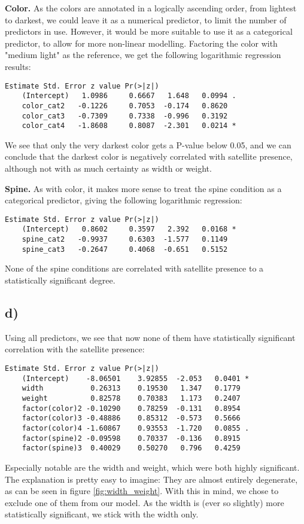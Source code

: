 \documentclass[a4paper, twocolumn]{article}
\begin{document}
\textbf{Color.} As the colors are annotated in a logically ascending order, from lightest to darkest, we could leave it as a numerical predictor, to limit the number of predictors in use. However, it would be more suitable to use it as a categorical predictor, to allow for more non-linear modelling. Factoring the color with "medium light" as the reference, we get the following logarithmic regression results:
\begin{Verbatim}[fontsize=\scriptsize]
                Estimate Std. Error z value Pr(>|z|)  
    (Intercept)   1.0986     0.6667   1.648   0.0994 .
    color_cat2   -0.1226     0.7053  -0.174   0.8620  
    color_cat3   -0.7309     0.7338  -0.996   0.3192  
    color_cat4   -1.8608     0.8087  -2.301   0.0214 *
\end{Verbatim}
We see that only the very darkest color gets a P-value below 0.05, and we can conclude that the darkest color is negatively correlated with satellite presence, although not with as much certainty as width or weight.

\textbf{Spine.} As with color, it makes more sense to treat the spine condition as a categorical predictor, giving the following logarithmic regression:
\begin{Verbatim}[fontsize=\scriptsize]
                Estimate Std. Error z value Pr(>|z|)  
    (Intercept)   0.8602     0.3597   2.392   0.0168 *
    spine_cat2   -0.9937     0.6303  -1.577   0.1149  
    spine_cat3   -0.2647     0.4068  -0.651   0.5152  
\end{Verbatim}
None of the spine conditions are correlated with satellite presence to a statistically significant degree.


\subsection*{d)}
Using all predictors, we see that now none of them have statistically significant correlation with the satellite presence:
\begin{Verbatim}[fontsize=\scriptsize]
                    Estimate Std. Error z value Pr(>|z|)  
    (Intercept)    -8.06501    3.92855  -2.053   0.0401 *
    width           0.26313    0.19530   1.347   0.1779  
    weight          0.82578    0.70383   1.173   0.2407  
    factor(color)2 -0.10290    0.78259  -0.131   0.8954  
    factor(color)3 -0.48886    0.85312  -0.573   0.5666  
    factor(color)4 -1.60867    0.93553  -1.720   0.0855 .
    factor(spine)2 -0.09598    0.70337  -0.136   0.8915  
    factor(spine)3  0.40029    0.50270   0.796   0.4259 
\end{Verbatim}
Especially notable are the width and weight, which were both highly significant. The explanation is pretty easy to imagine: They are almost entirely degenerate, as can be seen in figure \ref{fig:width_weight}. With this in mind, we chose to exclude one of them from our model. As the width is (ever so slightly) more statistically significant, we stick with the width only.
\end{document}
